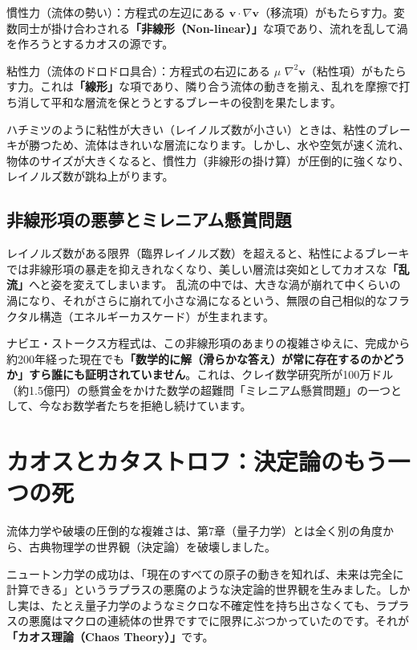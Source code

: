 慣性力（流体の勢い）：方程式の左辺にある \ensuremath{\mathbf{v}\cdot\nabla\mathbf{v}}（移流項）がもたらす力。変数同士が掛け合わされる\textbf{「非線形（Non-linear）」}な項であり、流れを乱して渦を作ろうとするカオスの源です。

粘性力（流体のドロドロ具合）：方程式の右辺にある \ensuremath{\mu} \ensuremath{\nabla^2\mathbf{v}}（粘性項）がもたらす力。これは\textbf{「線形」}な項であり、隣り合う流体の動きを揃え、乱れを摩擦で打ち消して平和な層流を保とうとするブレーキの役割を果たします。

ハチミツのように粘性が大きい（レイノルズ数が小さい）ときは、粘性のブレーキが勝つため、流体はきれいな層流になります。しかし、水や空気が速く流れ、物体のサイズが大きくなると、慣性力（非線形の掛け算）が圧倒的に強くなり、レイノルズ数が跳ね上がります。

\subsection{非線形項の悪夢とミレニアム懸賞問題}

レイノルズ数がある限界（臨界レイノルズ数）を超えると、粘性によるブレーキでは非線形項の暴走を抑えきれなくなり、美しい層流は突如としてカオスな\textbf{「乱流」}へと姿を変えてしまいます。 乱流の中では、大きな渦が崩れて中くらいの渦になり、それがさらに崩れて小さな渦になるという、無限の自己相似的なフラクタル構造（エネルギーカスケード）が生まれます。

ナビエ・ストークス方程式は、この非線形項のあまりの複雑さゆえに、完成から約200年経った現在でも\textbf{「数学的に解（滑らかな答え）が常に存在するのかどうか」すら誰にも証明されていません}。これは、クレイ数学研究所が100万ドル（約1.5億円）の懸賞金をかけた数学の超難問「ミレニアム懸賞問題」の一つとして、今なお数学者たちを拒絶し続けています。

\section{カオスとカタストロフ：決定論のもう一つの死}

流体力学や破壊の圧倒的な複雑さは、第7章（量子力学）とは全く別の角度から、古典物理学の世界観（決定論）を破壊しました。

ニュートン力学の成功は、「現在のすべての原子の動きを知れば、未来は完全に計算できる」というラプラスの悪魔のような決定論的世界観を生みました。しかし実は、たとえ量子力学のようなミクロな不確定性を持ち出さなくても、ラプラスの悪魔はマクロの連続体の世界ですでに限界にぶつかっていたのです。それが\textbf{「カオス理論（Chaos Theory）」}です。

